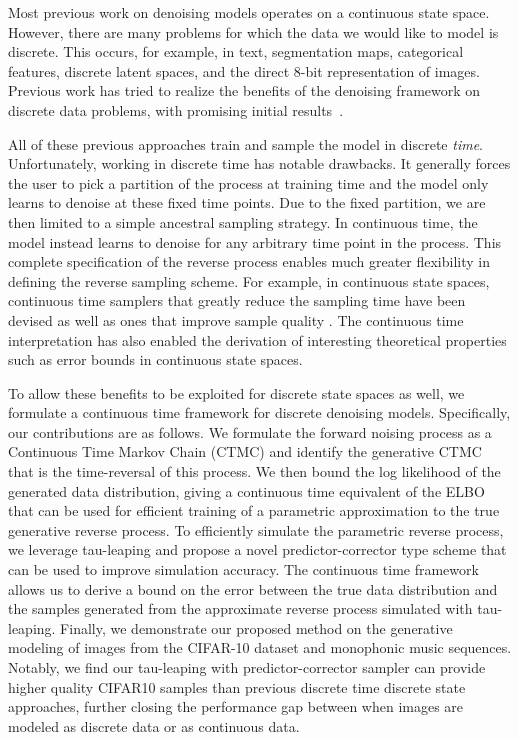 \documentclass{article}
\begin{document}
Most previous work on denoising models operates on a continuous state space. However, there are many problems for which the data we would like to model is discrete.
This occurs, for example, in text, segmentation maps, categorical features, discrete latent spaces, and the direct 8-bit representation of images. Previous work has tried to realize the benefits of the denoising framework on discrete data problems, with promising initial results~\cite{hoogeboom2021argmax, hoogeboom2021autoregressive, austin2021structured, esser2021imagebart, hoogeboom2022equivariant, cohen2022diffusion, johnson2021beyond, gu2021vector}. 

All of these previous approaches train and sample the model in discrete \emph{time}. 
Unfortunately, working in discrete time has notable drawbacks. It generally forces the user to pick a partition of the process at training time and the model only learns to denoise at these fixed time points. Due to the fixed partition, we are then limited to a simple ancestral sampling strategy. In continuous time, the model instead learns to denoise for any arbitrary time point in the process. This complete specification of the reverse process enables much greater flexibility in defining the reverse sampling scheme. For example, in continuous state spaces, continuous time samplers that greatly reduce the sampling time have been devised \cite{jolicoeur2021gotta, zhang2022fast, salimans2022progressive, chung2021come} as well as ones that improve sample quality \cite{song2020score, dockhorn2021score}. The continuous time interpretation has also enabled the derivation of interesting theoretical properties such as error bounds \cite{de2021diffusion} in continuous state spaces.


To allow these benefits to be exploited for discrete state spaces as well, we formulate a continuous time framework for discrete denoising models. Specifically, our contributions are as follows. We formulate the forward noising process as a Continuous Time Markov Chain (CTMC) and identify the generative CTMC that is the time-reversal of this process. We then bound the log likelihood of the generated data distribution, giving a continuous time equivalent of the ELBO that can be used for efficient training of a parametric approximation to the true generative reverse process. To efficiently simulate the parametric reverse process, we leverage tau-leaping \cite{gillespie2001approximate} and propose a novel predictor-corrector type scheme that can be used to improve simulation accuracy. The continuous time framework allows us to derive a bound on the error between the true data distribution and the samples generated from the approximate reverse process simulated with tau-leaping. Finally, we demonstrate our proposed method on the generative modeling of images from the CIFAR-10 dataset and monophonic music sequences. Notably, we find our tau-leaping with predictor-corrector sampler can provide higher quality CIFAR10 samples than previous discrete time discrete state approaches, further closing the performance gap between when images are modeled as discrete data or as continuous data.
\end{document}
